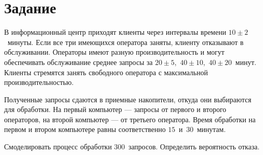 \chapter{Задание}

В информационный центр приходят клиенты через интервалы времени $10\pm2$~минуты.
Если все три имеющихся оператора заняты, клиенту отказывают в обслуживании.
Операторы имеют разную производительность и могут обеспечивать обслуживание
среднее запросы за $20\pm5$,~$40\pm10$,~$40\pm20$~минут. Клиенты стремятся
занять свободного оператора с максимальной производительностью.

Полученные запросы сдаются в приемные накопители, откуда они выбираются для
обработки. На первый компьютер --- запросы от первого и второго операторов, на
второй компьютер --- от третьего оператора. Время обработки на первом и втором
компьютере равны соответственно $15$~и~$30$~минутам.

Смоделировать процесс обработки $300$~запросов. Определить вероятность отказа.


